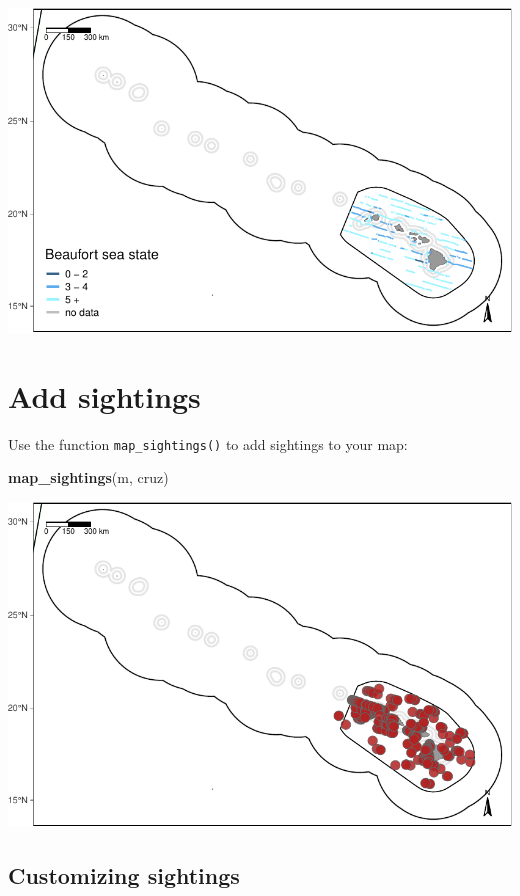 \documentclass[
]{book}
\newenvironment{Shaded}{\begin{snugshade}}{\end{snugshade}}
\newcommand{\KeywordTok}[1]{\textcolor[rgb]{0.13,0.29,0.53}{\textbf{#1}}}
\newcommand{\NormalTok}[1]{#1}
\begin{document}
\includegraphics{figures/unnamed-chunk-60-1.pdf}

\hypertarget{add-sightings}{%
\section*{Add sightings}\label{add-sightings}}

Use the function \texttt{map\_sightings()} to add sightings to your map:

\begin{Shaded}
\begin{Highlighting}[]
\KeywordTok{map_sightings}\NormalTok{(m, cruz)}
\end{Highlighting}
\end{Shaded}

\includegraphics{figures/unnamed-chunk-61-1.pdf}

\hypertarget{customizing-sightings}{%
\subsection*{Customizing sightings}\label{customizing-sightings}}
\end{document}
